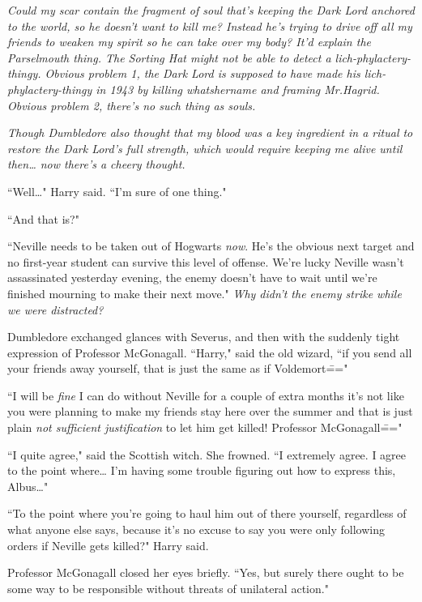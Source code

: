 \emph{Could my \emph{scar} contain the fragment of soul that's keeping the Dark Lord anchored to the world, so he doesn't want to kill me? Instead he's trying to drive off all my friends to weaken my spirit so he can take over my body? It'd explain the Parselmouth thing. The Sorting Hat might not be able to detect a lich-phylactery-thingy. Obvious problem 1, the Dark Lord is supposed to have made his lich-phylactery-thingy in 1943 by killing whatshername and framing Mr.\?Hagrid. Obvious problem 2, there's no such thing as souls.}

\emph{Though Dumbledore also thought that my blood was a key ingredient in a ritual to restore the Dark Lord's full strength, which would require keeping me alive until then{\ldots} now there's a cheery thought.}

``Well{\ldots}" Harry said. ``I'm sure of one thing."

``And that is?"

``Neville needs to be taken out of Hogwarts \emph{now}. He's the obvious next target and no first-year student can survive this level of offense. We're lucky Neville wasn't assassinated yesterday evening, the enemy doesn't have to wait until we're finished mourning to make their next move." \emph{Why didn't the enemy strike while we were distracted?}

Dumbledore exchanged glances with Severus, and then with the suddenly tight expression of Professor McGonagall. ``Harry," said the old wizard, ``if you send all your friends away yourself, that is just the same as if Voldemort\==="

``I will be \emph{fine} I can do without Neville for a couple of extra months it's not like you were planning to make my friends stay here over the summer and that is just plain \emph{not sufficient justification} to let him get killed! Professor McGonagall\==="

``I quite agree," said the Scottish witch. She frowned. ``I extremely agree. I agree to the point where{\ldots} I'm having some trouble figuring out how to express this, Albus{\ldots}"

``To the point where you're going to haul him out of there yourself, regardless of what anyone else says, because it's no excuse to say you were only following orders if Neville gets killed?" Harry said.

Professor McGonagall closed her eyes briefly. ``Yes, but surely there ought to be some way to be responsible without threats of unilateral action."

